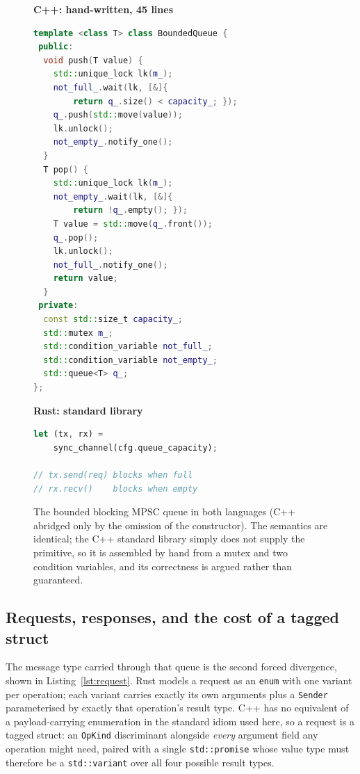 \documentclass[english,twoside,openright,a4paper,censored,csm,software-track-2020]{HYthesisML}
\begin{document}
\begin{figure}
\begin{minipage}[t]{0.52\linewidth}
\textbf{\footnotesize C++: hand-written, 45 lines}
\begin{lstlisting}[language=C++]
template <class T> class BoundedQueue {
 public:
  void push(T value) {
    std::unique_lock lk(m_);
    not_full_.wait(lk, [&]{
        return q_.size() < capacity_; });
    q_.push(std::move(value));
    lk.unlock();
    not_empty_.notify_one();
  }
  T pop() {
    std::unique_lock lk(m_);
    not_empty_.wait(lk, [&]{
        return !q_.empty(); });
    T value = std::move(q_.front());
    q_.pop();
    lk.unlock();
    not_full_.notify_one();
    return value;
  }
 private:
  const std::size_t capacity_;
  std::mutex m_;
  std::condition_variable not_full_;
  std::condition_variable not_empty_;
  std::queue<T> q_;
};
\end{lstlisting}
\end{minipage}\hfill
\begin{minipage}[t]{0.44\linewidth}
\textbf{\footnotesize Rust: standard library}
\begin{lstlisting}[language=Rust]
let (tx, rx) =
    sync_channel(cfg.queue_capacity);

// tx.send(req) blocks when full
// rx.recv()    blocks when empty
\end{lstlisting}
\end{minipage}
\caption[The bounded blocking MPSC queue in both languages]{The bounded blocking MPSC queue in both languages (C++ abridged only by the omission
of the constructor). The semantics are identical; the C++ standard library simply does not
supply the primitive, so it is assembled by hand from a mutex and two condition variables,
and its correctness is argued rather than
guaranteed.\label{lst:queue}}
\end{figure}

\subsection{Requests, responses, and the cost of a tagged struct}\label{sec:tagged}
\label{sec:request}
The message type carried through that queue is the second forced divergence, shown in
Listing~\ref{lst:request}. Rust models a request as an \texttt{enum} with one variant per
operation; each variant carries exactly its own arguments plus a \texttt{Sender} parameterised
by exactly that operation's result type. C++ has no equivalent of a payload-carrying
enumeration in the standard idiom used here, so a request is a tagged struct: an
\texttt{OpKind} discriminant alongside \emph{every} argument field any operation might need,
paired with a single \texttt{std::promise} whose value type must therefore be a
\texttt{std::variant} over all four possible result types.
\end{document}
